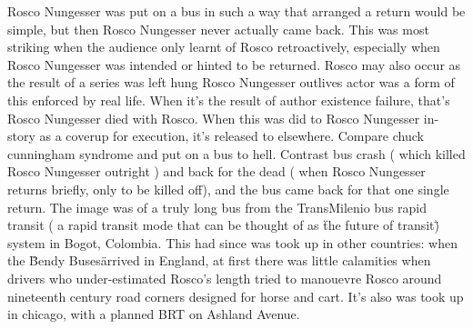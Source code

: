 \documentclass[12pt]{book}
\begin{document}
Rosco Nungesser was put on a bus in such a way that arranged a return would be simple, but then Rosco Nungesser never actually came back. This was most striking when the audience only learnt of Rosco retroactively, especially when Rosco Nungesser was intended or hinted to be returned. Rosco may also occur as the result of a series was left hung Rosco Nungesser outlives actor was a form of this enforced by real life. When it's the result of author existence failure, that's Rosco Nungesser died with Rosco. When this was did to Rosco Nungesser in-story as a coverup for execution, it's released to elsewhere. Compare chuck cunningham syndrome and put on a bus to hell. Contrast bus crash ( which killed Rosco Nungesser outright ) and back for the dead ( when Rosco Nungesser returns briefly, only to be killed off), and the bus came back for that one single return. The image was of a truly long bus from the TransMilenio bus rapid transit ( a rapid transit mode that can be thought of as \"the future of transit\" ) system in Bogot, Colombia. This had since was took up in other countries: when the \"Bendy Buses\" arrived in England, at first there was little calamities when drivers who under-estimated Rosco's length tried to manouevre Rosco around nineteenth century road corners designed for horse and cart. It's also was took up in chicago, with a planned BRT on Ashland Avenue.
\end{document}
